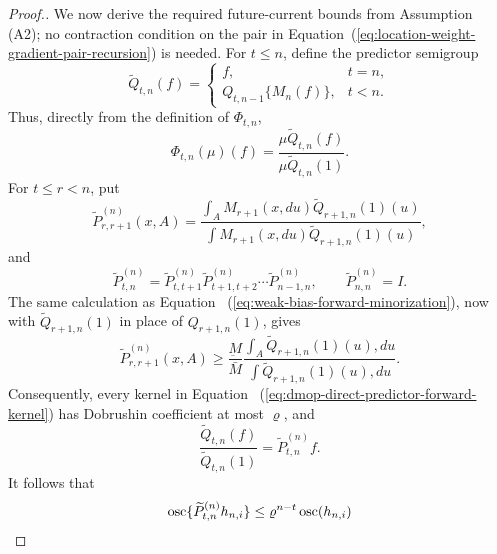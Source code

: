 \documentclass[11pt]{article}
\newcommand\refAssumpBoundedProcess{(A2)} %
\theoremstyle{thmstylethree}%
\begin{document}
\begin{proof}[Proof.]
We now derive the required future-current bounds from Assumption~
{\refAssumpBoundedProcess}; no contraction condition on the pair in
Equation~(\ref{eq:location-weight-gradient-pair-recursion}) is needed.
For $t\leq n$, define the predictor semigroup
\begin{equation}
\widetilde Q_{t,n}(f)
=
\begin{cases}
f,&t=n,\\
Q_{t,n-1}\{M_n(f)\},&t<n.
\end{cases}
\label{eq:dmop-direct-predictor-semigroup}
\end{equation}
Thus, directly from the definition of $\Phi_{t,n}$,
\begin{equation}
\Phi_{t,n}(\mu)(f)
=
\frac{\mu\widetilde Q_{t,n}(f)}
{\mu\widetilde Q_{t,n}(1)}.
\label{eq:dmop-direct-predictor-semigroup-ratio}
\end{equation}
For $t\leq r<n$, put
\begin{equation}
\widetilde P_{r,r+1}^{(n)}(x,A)
=
\frac{
\displaystyle\int_A
M_{r+1}(x,du)\widetilde Q_{r+1,n}(1)(u)
}{
\displaystyle\int
M_{r+1}(x,du)\widetilde Q_{r+1,n}(1)(u)
},
\label{eq:dmop-direct-predictor-forward-kernel}
\end{equation}
and
\begin{equation}
\widetilde P_{t,n}^{(n)}
=
\widetilde P_{t,t+1}^{(n)}
\widetilde P_{t+1,t+2}^{(n)}\cdots
\widetilde P_{n-1,n}^{(n)},
\qquad
\widetilde P_{n,n}^{(n)}=I.
\label{eq:dmop-direct-normalized-forward-product}
\end{equation}
The same calculation as Equation~
(\ref{eq:weak-bias-forward-minorization}), now with
$\widetilde Q_{r+1,n}(1)$ in place of $Q_{r+1,n}(1)$, gives
\begin{equation}
\widetilde P_{r,r+1}^{(n)}(x,A)
\geq
\frac{\underbar M}{\bar M}
\frac{
\displaystyle\int_A\widetilde Q_{r+1,n}(1)(u),du
}{
\displaystyle\int\widetilde Q_{r+1,n}(1)(u),du
}.
\label{eq:dmop-direct-predictor-forward-minorization}
\end{equation}
Consequently, every kernel in Equation~
(\ref{eq:dmop-direct-predictor-forward-kernel}) has Dobrushin coefficient
at most $\varrho$, and
\begin{equation}
\frac{\widetilde Q_{t,n}(f)}{\widetilde Q_{t,n}(1)}
=
\widetilde P_{t,n}^{(n)}f.
\label{eq:dmop-direct-predictor-kernel-factorization}
\end{equation}
It follows that
\begin{align}
\operatorname{osc}\{\widetilde P_{t,n}^{(n)}h_{n,i}\}
&\leq
\varrho^{n-t}\operatorname{osc}(h_{n,i})                  \notag\\

\end{align}
\end{proof}
\end{document}
